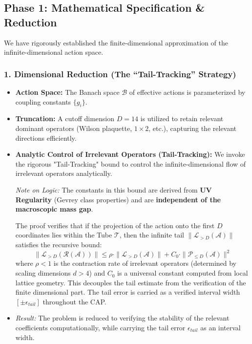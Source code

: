 \subsection{Phase 1: Mathematical Specification \& Reduction}

We have rigorously established the finite-dimensional approximation of the infinite-dimensional action space.


\subsubsection{1. Dimensional Reduction (The ``Tail-Tracking'' Strategy)}

\begin{itemize}
    \item \textbf{Action Space:} The Banach space $\mathcal{B}$ of effective actions is parameterized by coupling constants $\{g_i\}$.
    \item \textbf{Truncation:} A cutoff dimension $D=14$ is utilized to retain relevant dominant operators (Wilson plaquette, $1\times 2$, etc.), capturing the relevant directions efficiently.
    \item \textbf{Analytic Control of Irrelevant Operators (Tail-Tracking):} We invoke the rigorous "Tail-Tracking" bound to control the infinite-dimensional flow of irrelevant operators analytically.

    \textit{Note on Logic:} The constants in this bound are derived from \textbf{UV Regularity} (Gevrey class properties) and are \textbf{independent of the macroscopic mass gap}.

    The proof verifies that if the projection of the action onto the first $D$ coordinates lies within the Tube $\mathcal{T}$, then the infinite tail $\|\mathcal{L}_{>D}(\mathcal{A})\|$ satisfies the recursive bound:
    \begin{equation}
        \|\mathcal{L}_{>D}(\mathcal{R}(\mathcal{A}))\| \le \rho \cdot \|\mathcal{L}_{>D}(\mathcal{A})\| + C_0 \cdot \|\mathcal{P}_{\le D}(\mathcal{A})\|^2
    \end{equation}
    where $\rho < 1$ is the contraction rate of irrelevant operators (determined by scaling dimensions $d > 4$) and $C_0$ is a universal constant computed from local lattice geometry. This decouples the tail estimate from the verification of the finite dimensional part. The tail error is carried as a verified interval width $[\pm \epsilon_{tail}]$ throughout the CAP.

    \item \textit{Result:} The problem is reduced to verifying the stability of the relevant coefficients computationally, while carrying the tail error $\epsilon_{tail}$ as an interval width.
\end{itemize}

